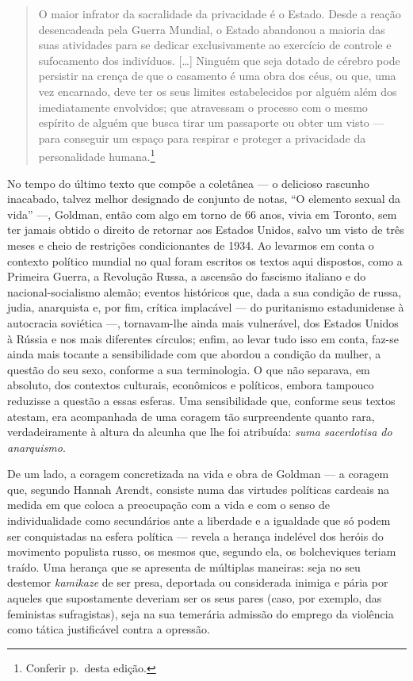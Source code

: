 \begin{quote}
O maior infrator da sacralidade da privacidade é o Estado. Desde a
reação desencadeada pela Guerra Mundial, o Estado abandonou a maioria
das suas atividades para se dedicar exclusivamente ao exercício de
controle e sufocamento dos indivíduos. {[}\ldots{]} Ninguém que seja dotado
de cérebro pode persistir na crença de que o casamento é uma obra dos
céus, ou que, uma vez encarnado, deve ter os seus limites estabelecidos
por alguém além dos imediatamente envolvidos; que atravessam o processo
com o mesmo espírito de alguém que busca tirar um passaporte ou obter um
visto --- para conseguir um espaço para respirar e proteger a privacidade
da personalidade humana.\footnote{Conferir p.\,\pageref{ref3} desta edição.}
\end{quote}

No tempo do último texto que compõe a coletânea --- o delicioso
rascunho inacabado, talvez melhor designado de conjunto de notas,
``O elemento sexual da vida'' ---, Goldman, então com algo em
torno de 66 anos, vivia em Toronto, sem ter jamais obtido o
direito de retornar aos Estados Unidos, salvo um visto de três meses e
cheio de restrições condicionantes de 1934. Ao levarmos em conta o
contexto político mundial no qual foram escritos os textos aqui dispostos,
como a Primeira Guerra, a Revolução Russa, a ascensão do fascismo
italiano e do nacional-socialismo alemão; eventos históricos
que, dada a sua condição de russa, judia, anarquista e, por
fim, crítica implacável --- do puritanismo estadunidense à autocracia
soviética ---, tornavam-lhe ainda mais vulnerável, dos Estados Unidos
à Rússia e nos mais diferentes círculos; enfim, ao levar tudo isso em
conta, faz-se ainda mais tocante a sensibilidade com que abordou a
condição da mulher, a questão do seu sexo, conforme a sua terminologia.
O que não separava, em absoluto, dos contextos culturais, econômicos e
políticos, embora tampouco reduzisse a questão a essas esferas. Uma
sensibilidade que, conforme seus textos atestam, era acompanhada de
uma coragem tão surpreendente quanto rara, verdadeiramente à altura da
alcunha que lhe foi atribuída: \textit{suma sacerdotisa do anarquismo}.


De um lado, a coragem concretizada na vida e obra de Goldman --- a
coragem que, segundo Hannah Arendt, consiste numa das virtudes políticas
cardeais na medida em que coloca a preocupação com a vida e com o senso
de individualidade como secundários ante a liberdade e a igualdade que
só podem ser conquistadas na esfera política --- revela a herança
indelével dos heróis do movimento populista russo, os mesmos que,
segundo ela, os bolcheviques teriam traído. Uma herança que se apresenta
de múltiplas maneiras: seja no seu destemor
\textit{kamikaze} de ser presa, deportada ou considerada inimiga e pária por
aqueles que supostamente deveriam ser os seus pares (caso, por exemplo,
das feministas sufragistas), seja na sua temerária admissão do emprego
da violência como tática justificável contra a opressão.

